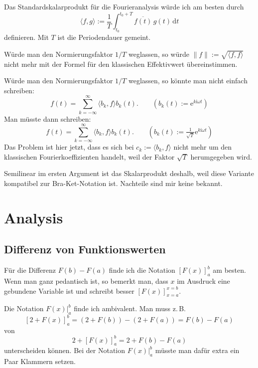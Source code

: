 \documentclass[a4paper,11pt,fleqn,twoside,BCOR=16mm]{scrartcl}
\newcommand{\ee}{\mathrm e}
\newcommand{\ui}{\mathrm i}
\begin{document}
Das Standardskalarprodukt für die Fourieranalysis würde ich
am besten durch
\begin{equation}\label{eq:FourierSP}
\langle f,g\rangle := \frac{1}{T}\int_{t_0}^{t_0+T}
\overline{f(t)}\,g(t)\,\mathrm dt
\end{equation}
definieren. Mit $T$ ist die Periodendauer gemeint.

Würde man den Normierungsfaktor $1/T$ weglassen, so würde
$\|f\|:=\sqrt{\langle f,f\rangle}$ nicht mehr mit der Formel
für den klassischen Effektivwert übereinstimmen.

Würde man den Normierungsfaktor $1/T$ weglassen, so könnte man
nicht einfach schreiben:
\begin{equation}
f(t) = \sum_{k=-\infty}^\infty \langle b_k,f\rangle b_k(t).
\qquad (b_k(t):=\ee^{k\ui \omega t})
\end{equation}
Man müsste dann schreiben:
\begin{equation}
f(t) = \sum_{k=-\infty}^{\infty} \langle b_k,f\rangle b_k(t).
\qquad(b_k(t):=\tfrac{1}{\sqrt{T}}\ee^{k\ui \omega t})
\end{equation}
Das Problem ist hier jetzt, dass es sich bei $c_k:=\langle b_k,f\rangle$
nicht mehr um den klassischen Fourierkoeffizienten handelt, weil
der Faktor $\sqrt{T}$ herumgegeben wird.

Semilinear im ersten Argument ist das Skalarprodukt deshalb, weil
diese Variante kompatibel zur Bra-Ket-Notation ist. Nachteile sind
mir keine bekannt.

\section{Analysis}
\subsection{Differenz von Funktionswerten}
Für die Differenz $F(b)-F(a)$ finde ich die Notation $[F(x)]_a^b$
am besten. Wenn man ganz pedantisch ist, so bemerkt man, dass
$x$ im Ausdruck eine gebundene Variable ist und schreibt besser
$[F(x)]_{x=a}^{x=b}$.

Die Notation $F(x)|_a^b$ finde ich ambivalent. Man muss z.\,B.
\[[2+F(x)]_a^b = (2+F(b))-(2+F(a)) = F(b)-F(a)\]
von
\[2+[F(x)]_a^b = 2+F(b)-F(a)\]
unterscheiden können. Bei der Notation $F(x)|_a^b$ müsste
man dafür extra ein Paar Klammern setzen.
\end{document}
